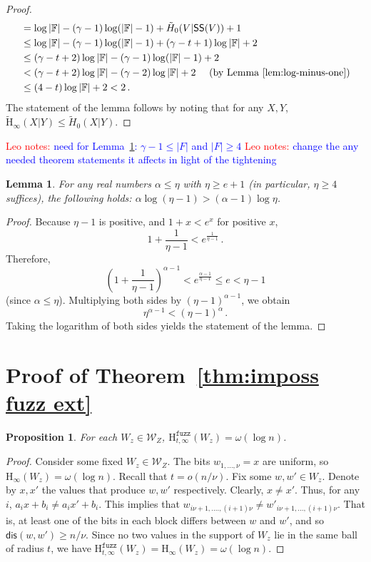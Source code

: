 \documentclass[11pt]{article}
\newcommand{\thref}[1]{\mbox{Theorem~\ref{#1}}}
\newcommand{\lemref}[1]{\mbox{Lemma~\ref{#1}}}
\newcommand{\class}[1]{{\ensuremath{\mathsf{#1}}}}
\newcommand{\sketch}{\ensuremath{\class{SS}}\xspace}
\newcommand{\dis}{\ensuremath{\mathsf{dis}}}
\newcommand{\Hoo}{\mathrm{H}_\infty}
\newcommand{\Hav}{\tilde{\mathrm{H}}_\infty}
\newcommand{\Hfuzz}{\mathrm{H}^{\mathtt{fuzz}}_{t,\infty}}
\newtheorem{lemma}[theorem]{Lemma}
\newtheorem{proposition}[theorem]{Proposition}
\newcommand{\authnote}[2]{{\textcolor{red}{\textsf{#1 notes: }\textcolor{blue}{ #2}}\marginpar{\textcolor{red}{\textbf{!!!!!}}}}}
\newcommand{\authnote}[2]{}
\newcommand{\lnote}[1]{{\authnote{Leo}{#1}}}
\begin{document}
\begin{proof}
\begin{align*}
&=\log |\mathbb{F}| - (\gamma -1)\log (|\mathbb{F}|-1) + \tilde{H}_0(V | \sketch(V)) +1 \\ 
&\le \log |\mathbb{F}| - (\gamma -1)\log (|\mathbb{F}|-1) + (\gamma-t+1)\log |\mathbb{F}|+2\\
&\le (\gamma-t+2)\log |\mathbb{F}| - (\gamma-1) \log (|\mathbb{F}|-1)+2\\
&< (\gamma-t+2)\log |\mathbb{F}| - (\gamma-2) \log |\mathbb{F}| +2 \ \ \ \ \mbox{(by \lemref{lem:log-minus-one})}\\
&\le (4-t)\log |\mathbb{F}| +2< 2\,.
\end{align*}
The statement of the lemma follows by noting that for any $X, Y$, $\Hav(X|Y)\le \tilde{H}_0(X|Y)$.
\end{proof}

\lnote{need for \lemref{lem:log-minus-one}:  $\gamma-1\le |F|$ and $|F|\ge 4$}
\lnote{change the any needed theorem statements it affects in light of the tightening}

\begin{lemma}
\label{lem:log-minus-one}
For any real numbers $\alpha \leq \eta$ with $\eta \ge e+1$ (in particular, $\eta\ge 4$ suffices), the following holds:
$\alpha \log (\eta-1) > (\alpha-1)\log \eta$. 
\end{lemma}

\begin{proof}
Because $\eta-1$ is positive, and $1+x<e^x$ for positive $x$,
$$1+\frac{1}{\eta-1} < e^{\frac{1}{\eta -1}}\,.$$  Therefore, 
$$\left(1+\frac{1}{\eta-1}\right)^{\alpha-1} < e^{\frac{\alpha-1}{\eta-1}}\le e < \eta-1$$ (since $\alpha\le \eta$). Multiplying both sides by $(\eta-1)^{\alpha-1}$, we obtain
$$\eta^{\alpha-1} < (\eta-1)^\alpha\,.$$
Taking the logarithm of both sides yields the statement of the lemma.
\end{proof}


\section{Proof of \thref{thm:imposs fuzz ext}}
\label{sec:fuzz ext proof}
\begin{proposition} 
\label{prop:dist fuzzy ent fuzz}
For each $W_z\in\mathcal{W}_Z$, $\Hfuzz(W_z) = \omega(\log n)$.
\end{proposition}
\begin{proof}
Consider some fixed $W_z\in\mathcal{W}_Z$.  The bits $w_{1,..., \nu} =x$ are uniform, so $\Hoo(W_z) =\omega(\log n)$.  Recall that $t=o (n/\nu)$. 
Fix some $w, w'\in W_z$.  Denote by $x, x'$ the values that produce $w, w'$ respectively.  Clearly, $x\neq x'$.  Thus, for any $i$, $a_i x + b_i \neq a_i x' + b_i$.  This implies that $w_{i\nu+1,...., (i+1)\nu} \neq w'_{i\nu+1,..., (i+1)\nu}$. That is, at least one of the bits in each block differs between $w$ and $w'$, and so $\dis(w, w') \ge n/\nu$. Since no two values in the support of $W_z$ lie in the same ball of radius $t$, we have $\Hfuzz(W_z) = \Hoo(W_z)= \omega(\log n)$.
\end{proof}
\end{document}
